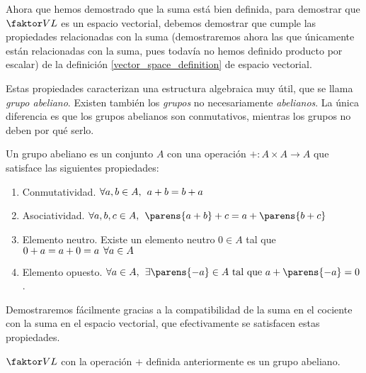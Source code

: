 \documentclass[../algebra_lineal.tex]{subfiles}
\begin{document}
Ahora que hemos demostrado que la suma está bien definida, para demostrar que $\qs{V}{L}$ es un espacio vectorial, debemos demostrar que cumple las propiedades relacionadas con la suma (demostraremos ahora las que únicamente están relacionadas con la suma, pues todavía no hemos definido producto por escalar) de la definición \ref{vector_space_definition} de espacio vectorial. 

Estas propiedades caracterizan una estructura algebraica muy útil, que se llama \textit{grupo abeliano}. Existen también los \textit{grupos} no necesariamente \textit{abelianos}. La única diferencia es que los grupos abelianos son conmutativos, mientras los grupos no deben por qué serlo.

\begin{definition}
    \label{definicion_grupo_abeliano}
    Un grupo abeliano es un conjunto $A$ con una operación  $+ : A \times A \to A$ que satisface las siguientes propiedades:
    \begin{enumerate}
        \item Conmutatividad. $\forall a, b \in A, \hspace{1.5mm} a + b = b + a$
        \item Asociatividad. $\forall a, b, c \in A, \spc \parens{a + b} + c = a + \parens{b+c}$
        \item Elemento neutro. Existe un elemento neutro $0 \in A$ tal que $0 + a = a + 0 = a \hspace{1.5mm} \forall a \in A $
        \item Elemento opuesto. $\forall a \in A, \spc \exists \parens{-a} \in A \st a + \parens{-a} = 0$.
    \end{enumerate}
\end{definition}

Demostraremos fácilmente gracias a la compatibilidad de la suma en el cociente con la suma en el espacio vectorial, que efectivamente se satisfacen estas propiedades.

\begin{proposition}
    $\qs{V}{L}$ con la operación $+$ definida anteriormente es un grupo abeliano.
\end{proposition}
\end{document}
